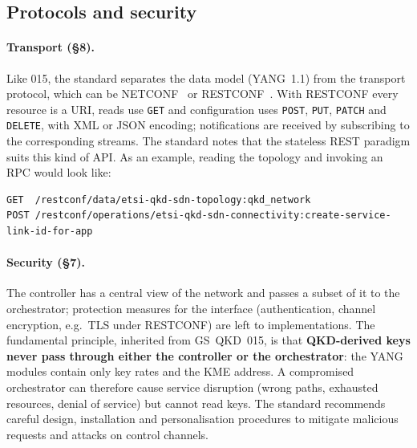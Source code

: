 \subsection{Protocols and security}
\label{sec:protocolli}

\paragraph{Transport (§8).}
Like 015, the standard separates the data model (YANG~1.1) from the
transport protocol, which can be NETCONF~\cite{rfc6241} or
RESTCONF~\cite{rfc8040}. With RESTCONF every resource is a URI, reads use
\texttt{GET} and configuration uses \texttt{POST}, \texttt{PUT},
\texttt{PATCH} and \texttt{DELETE}, with XML or JSON encoding;
notifications are received by subscribing to the corresponding streams.
The standard notes that the stateless REST paradigm suits this kind of API.
As an example, reading the topology and invoking an RPC would look like:
\begin{lstlisting}
GET  /restconf/data/etsi-qkd-sdn-topology:qkd_network
POST /restconf/operations/etsi-qkd-sdn-connectivity:create-service-link-id-for-app
\end{lstlisting}

\paragraph{Security (§7).}
The controller has a central view of the network and passes a subset of it
to the orchestrator; protection measures for the interface (authentication,
channel encryption, e.g.\ TLS under RESTCONF) are left to implementations.
The fundamental principle, inherited from GS~QKD~015, is that
\textbf{QKD-derived keys never pass through either the controller or the
orchestrator}: the YANG modules contain only key rates and the KME address.
A compromised orchestrator can therefore cause service disruption (wrong
paths, exhausted resources, denial of service) but cannot read keys. The
standard recommends careful design, installation and personalisation
procedures to mitigate malicious requests and attacks on control channels.
